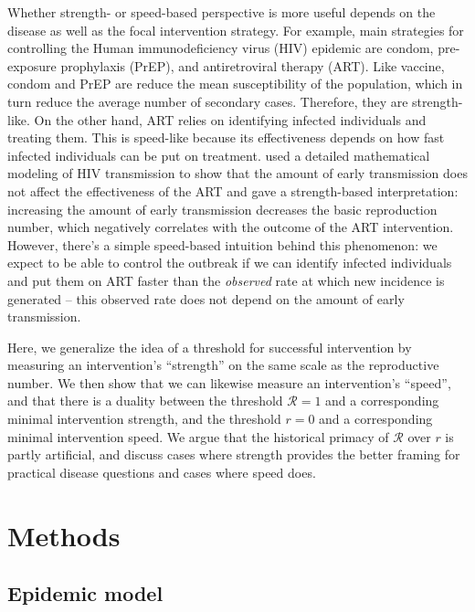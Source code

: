\documentclass[12pt]{article}\usepackage[]{graphicx}\usepackage[]{color}
\newcommand{\RR}{\ensuremath{{\mathcal R}}}
\begin{document}
Whether strength- or speed-based perspective is more useful depends on the disease as well as the focal intervention strategy.
For example, main strategies for controlling the Human immunodeficiency virus (HIV) epidemic are condom, pre-exposure prophylaxis (PrEP), and antiretroviral therapy (ART).
Like vaccine, condom and PrEP are reduce the mean susceptibility of the population, which in turn reduce the average number of secondary cases. Therefore, they are strength-like.
On the other hand, ART relies on identifying infected individuals and treating them. This is speed-like because its effectiveness depends on how fast infected individuals can be put on treatment.
\cite{eaton2014proportion} used a detailed mathematical modeling of HIV transmission to show that the amount of early transmission does not affect the effectiveness of the ART and gave a strength-based interpretation: increasing the amount of early transmission decreases the basic reproduction number, which negatively correlates with the outcome of the ART intervention. 
However, there's a simple speed-based intuition behind this phenomenon: we expect to be able to control the outbreak if we can identify infected individuals and put them on ART faster than the \emph{observed} rate at which new incidence is generated -- this observed rate does not depend on the amount of early transmission.

Here, we generalize the idea of a threshold for successful intervention by measuring an intervention's ``strength'' on the same scale as the reproductive number. 
We then show that we can likewise measure an intervention's ``speed'', and that there is a duality between the threshold $\RR=1$ and a corresponding minimal intervention strength, and the threshold $r=0$ and a corresponding minimal intervention speed. 
We argue that the historical primacy of $\RR$ over $r$ is partly artificial, and discuss cases where strength provides the better framing for practical disease questions and cases where speed does.

\section{Methods}

\subsection{Epidemic model}
\end{document}
